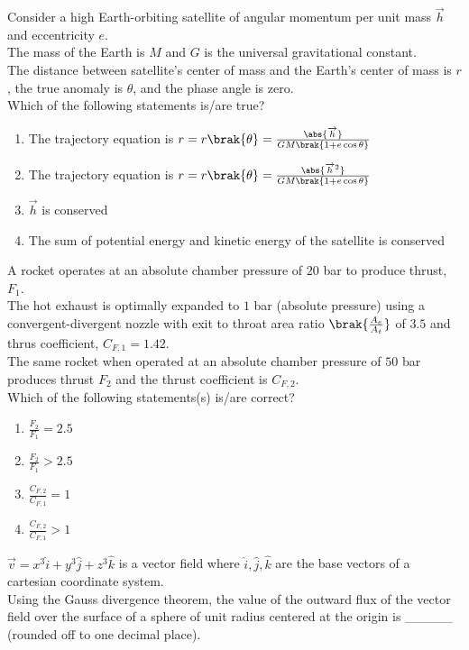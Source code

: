     \item Consider a high Earth-orbiting satellite of angular momentum per unit mass $\overrightarrow{h}$ and eccentricity $e$.\\The mass of the Earth is $M$ and $G$ is the universal gravitational constant.\\The distance between satellite's center of mass and the Earth's center of mass is $r$, the true anomaly is $\theta$, and the phase angle is zero.\\Which of the following statements is/are true?
        \begin{enumerate}
            \item The trajectory equation is $r = r\brak{\theta} = \frac{\abs{\overrightarrow{h}}}{GM \brak{1+ e \cos \theta}}$
            \item The trajectory equation is $r = r\brak{\theta} = \frac{\abs{\overrightarrow{h}^2}}{GM \brak{1+ e \cos \theta}}$
            \item $\overrightarrow{h}$ is conserved
            \item The sum of potential energy and kinetic energy of the satellite is conserved
        \end{enumerate}

        \item A rocket operates at an absolute chamber pressure of $20$ bar to produce thrust, $F_1$.\\The hot exhaust is optimally expanded to $1$ bar (absolute pressure) using a convergent-divergent nozzle with exit to throat area ratio $\brak{\frac{A_e}{A_t}}$ of $3.5$ and thrus coefficient, $C_{F,1}=1.42$.\\The same rocket when operated at an absolute chamber pressure of $50$ bar produces thrust $F_2$ and the thrust coefficient is $C_{F,2}$.\\Which of the following statements(s) is/are correct?
            \begin{enumerate}
                \item $\frac{F_2}{F_1} = 2.5$
                \item $\frac{F_2}{F_1} > 2.5$
                \item $\frac{C_{F,2}}{C_{F,1}} = 1$
                \item $\frac{C_{F,2}}{C_{F,1}} > 1$
            \end{enumerate}

        \item $\overrightarrow{v} = x^3 \hat{i} + y^3 \hat{j} + z^3 \hat{k}$ is a vector field where $\hat{i},\hat{j},\hat{k}$ are the base vectors of a cartesian coordinate system.\\Using the Gauss divergence theorem, the value of the outward flux of the vector field over the surface of a sphere of unit radius centered at the origin is \_\_\_\_\_ (rounded off to one decimal place).

